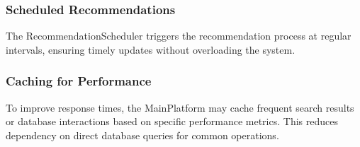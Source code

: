 \subsubsection{Scheduled Recommendations}
The RecommendationScheduler triggers the recommendation process at regular intervals, ensuring timely updates without overloading the system.

\subsubsection{Caching for Performance}
To improve response times, the MainPlatform may cache frequent search results or database interactions based on specific performance metrics. This reduces dependency on direct database queries for common operations.


